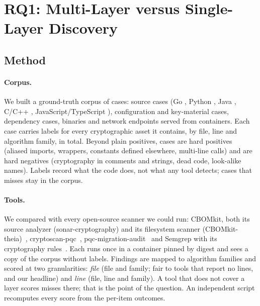 \section{RQ1: Multi-Layer versus Single-Layer Discovery}
\label{sec:rq1}

\subsection{Method}

\paragraph{Corpus.} We built a ground-truth corpus of 
cases:  source cases (Go ,
Python , Java , C/C++
, JavaScript/\allowbreak TypeScript ),
 configuration and key-material cases,
 dependency cases,  binaries
and  network endpoints served from containers. Each
case carries labels for every cryptographic asset it contains, by file, line
and algorithm family,  in total. Beyond plain positives,
 cases are hard positives (aliased imports,
wrappers, constants defined elsewhere, multi-line calls) and
 are hard negatives (cryptography in comments
and strings, dead code, look-alike names). Labels record what the code does,
not what any tool detects; cases that \tool{} misses stay in the corpus.

\paragraph{Tools.} We compared \tool{} with every open-source scanner we could
run: CBOMkit, both its source analyzer (sonar-cryptography) and its
filesystem scanner (CBOMkit-theia)~\cite{cbomkit}, cryptoscan-pqc~\cite{cryptoscanpqc},
pqc-migration-audit~\cite{pqcaudit} and Semgrep with its cryptography
rules~\cite{semgrep}. Each runs once in a container pinned by digest and sees
a copy of the corpus without labels. Findings are mapped to algorithm families and
scored at two granularities: \emph{file} (file and family; fair to tools that
report no lines, and our headline) and \emph{line} (file, line and family). A
tool that does not cover a layer scores misses there; that is the point of
the question. An independent script recomputes every score from the
per-item outcomes.

